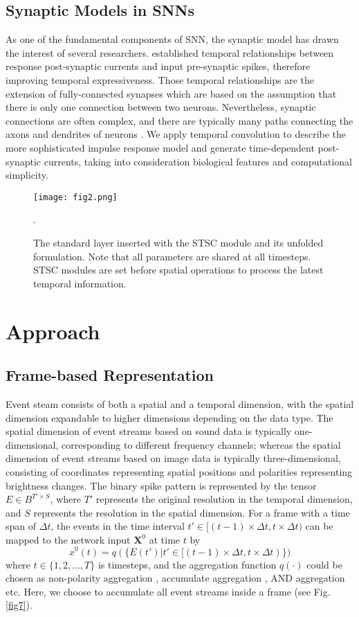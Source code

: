 \documentclass[letterpaper]{article} \usepackage[submission]{aaai23}  \usepackage{times}  \usepackage{helvet}  \usepackage{courier}  \usepackage[hyphens]{url}  \usepackage{graphicx} \urlstyle{rm} \def\UrlFont{\rm}  \usepackage{natbib}  \usepackage{caption} \frenchspacing  \setlength{\pdfpagewidth}{8.5in} \setlength{\pdfpageheight}{11in} \usepackage{algorithm}
\begin{document}
\subsection{Synaptic Models in SNNs}
As one of the fundamental components of SNN, the synaptic model has drawn the interest of several researchers. \cite{shrestha_slayer_2018,fang_exploiting_2020,yu_map-snn_2022} established temporal relationships between response post-synaptic currents and input pre-synaptic spikes, therefore improving temporal expressiveness. Those temporal relationships are the extension of fully-connected synapses
which are based on the assumption that there is only one connection between two neurons.
Nevertheless, synaptic connections are often complex, and there are typically many paths connecting the axons and dendrites of neurons \cite{luo_architectures_nodate,letellier_differential_2019}. 
We apply temporal convolution to describe the more sophisticated impulse response model and generate time-dependent post-synaptic currents, taking into consideration biological features and computational simplicity.

\begin{figure}[t]
\centering
\texttt{[image: fig2.png]} 
\caption{The standard layer inserted with the STSC module and its unfolded formulation. Note that all parameters are shared at all timesteps. STSC modules are set before spatial operations to process the latest temporal information.
}.
\label{fig2}
\end{figure}
\section{Approach}
\subsection{Frame-based Representation}
Event steam consists of both a spatial and a temporal dimension, with the spatial dimension expandable to higher dimensions depending on the data type.
The spatial dimension of event streams based on sound data is typically one-dimensional, corresponding to different frequency channels; whereas the spatial dimension of event streams based on image data is typically three-dimensional, consisting of coordinates representing spatial positions and polarities representing brightness changes.
The binary spike pattern is represented by the tensor $E\in B^{T'\times S}$, where $T'$ represents the original resolution in the temporal dimension, and $S$ represents the resolution in the spatial dimension.
For a frame with a time span of $\Delta t$, the events in the time interval $t'\in [(t-1)\times \Delta t,t\times \Delta t)$ can be mapped to the network input $\mathbf{X}^0$ at time $t$ by
\begin{equation}
    x^0(t)=q(\{E(t')|t'\in [(t-1)\times \Delta t,t\times \Delta t)\} )
\end{equation}
where $t\in\{1,2,...,T\}$ is timesteps, and the aggregation function $q(\cdot)$ could be chosen as non-polarity aggregation \cite{massa_efficient_2020}, accumulate aggregation \cite{deng_rethinking_2020}, AND aggregation \cite{he_comparing_2020} etc. Here, we choose to accumulate all event streams inside a frame (see Fig. \ref{fig7}).
\end{document}
